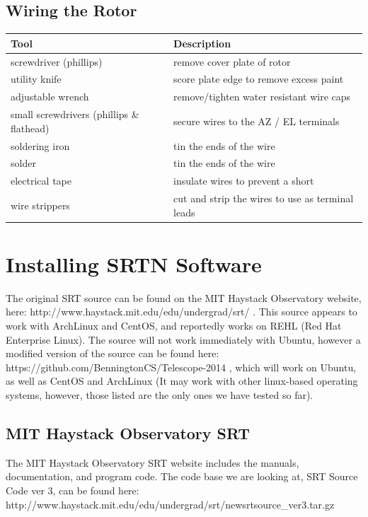 \documentclass[11pt]{article} %
\begin{document}
\subsection{Wiring the Rotor}
\begin{tabular}{| l | l |}
\hline
\textbf{Tool} & \textbf{Description} \\ \hline \hline
screwdriver (phillips) & remove cover plate of rotor \\ \hline
utility knife & score plate edge to remove excess paint \\ \hline
adjustable wrench & remove/tighten water resistant wire caps \\ \hline
small screwdrivers (phillips \& flathead) & secure wires to the AZ / EL terminals \\ \hline
soldering iron & tin the ends of the wire \\ \hline
solder & tin the ends of the wire \\ \hline
electrical tape & insulate wires to prevent a short \\ \hline
wire strippers & cut and strip the wires to use as terminal leads \\ \hline
\end{tabular}



\newpage
\section{Installing SRTN Software}

The original SRT source can be found on the MIT Haystack Observatory website, here: http://www.haystack.mit.edu/edu/undergrad/srt/ . This source appears to work with ArchLinux and CentOS, and reportedly works on REHL (Red Hat Enterprise Linux). The source will not work immediately with Ubuntu, however a modified version of the source can be found here: https://github.com/BenningtonCS/Telescope-2014 , which will work on Ubuntu, as well as CentOS and ArchLinux (It may work with other linux-based operating systems, however, those listed are the only ones we have tested so far). 

\subsection{MIT Haystack Observatory SRT}
The MIT Haystack Observatory SRT website includes the manuals, documentation, and program code. The code base we are looking at, SRT Source Code ver 3, can be found here: \\ http://www.haystack.mit.edu/edu/undergrad/srt/newsrtsource\_ver3.tar.gz
\end{document}
